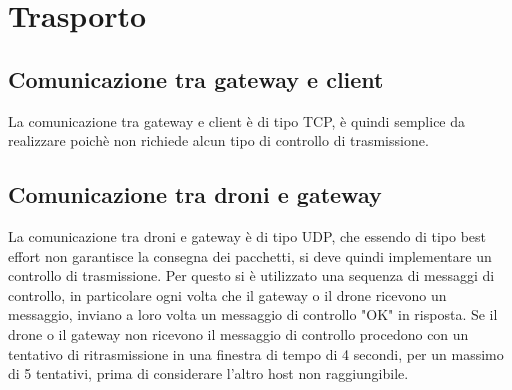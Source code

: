\documentclass[a4paper,12pt]{report}
\begin{document}
\chapter{Trasporto}
\section{Comunicazione tra gateway e client}
La comunicazione tra gateway e client è di tipo TCP, è quindi semplice da realizzare poichè non richiede alcun tipo di controllo di trasmissione.
\section{Comunicazione tra droni e gateway}
La comunicazione tra droni e gateway è di tipo UDP, che essendo di tipo best effort non garantisce la consegna dei pacchetti, si deve quindi implementare un controllo 
di trasmissione. Per questo si è utilizzato una sequenza di messaggi di controllo, in particolare ogni volta che il gateway o il drone ricevono un messaggio, inviano a 
loro volta un messaggio di controllo "OK" in risposta. Se il drone o il gateway non ricevono il messaggio di controllo procedono con un tentativo di ritrasmissione in una
finestra di tempo di 4 secondi, per un massimo di 5 tentativi, prima di considerare l'altro host non raggiungibile.

\begin{figure}[p]
 \end{figure}
\end{document}
